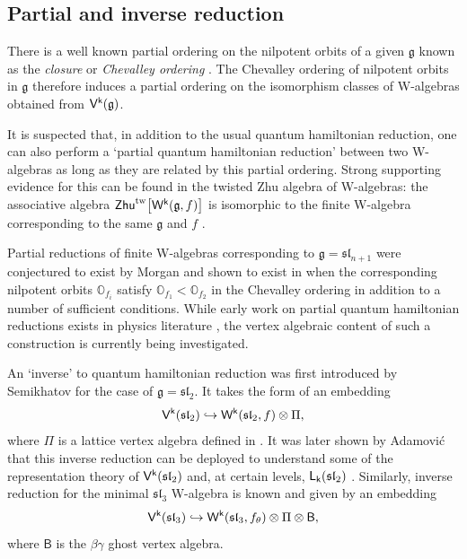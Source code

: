\documentclass[10pt,a4paper]{amsart}
\numberwithin{equation}{section}
\newcommand{\kk}{\mathsf{k}}   %
\DeclarePairedDelimiter{\brac}{\lparen}{\rparen}   %
\DeclarePairedDelimiter{\sqbrac}{\lbrack}{\rbrack} %
\newcommand{\alg}[1]{\mathfrak{#1}}  %
\newcommand{\VOA}[1]{\mathsf{#1}}    %
\newcommand{\SLA}[2]{\alg{#1}_{#2}}                      %
\newcommand{\sltwo}{\SLA{sl}{2}}
\newcommand{\slthree}{\SLA{sl}{3}}
\newcommand{\slnpone}{\SLA{sl}{n+1}}
\newcommand{\Wsymb}{\VOA{W}}
\newcommand{\uaffvoa}[2]{\VOA{V}^{#1}\brac{#2}}                   %
\newcommand{\saffvoa}[2]{\VOA{L}_{#1}\brac{#2}}                   %
\newcommand{\bgvoa}{\VOA{B}}                                      %
\newcommand{\halflattice}{\Pi}                          		  %
\newcommand{\uQHR}[3]{\Wsymb^{#1}\brac{#2,#3}}                    %
\newcommand{\twist}{\textup{tw}}                         		  %
\newcommand{\twzhu}[1]{\mathsf{Zhu}^{\twist}\sqbrac[\big]{#1}} 	  %
\theoremstyle{plain}
\begin{document}
\subsection{Partial and inverse reduction} \label{subsec:Ordering}
There is a well known partial ordering on the nilpotent orbits of a given $\mathfrak{g}$ known as the \emph{closure} or \emph{Chevalley ordering} \cite{Collingwood17}. The Chevalley ordering of nilpotent orbits in $\mathfrak{g}$ therefore induces a partial ordering on the isomorphism classes of W-algebras obtained from $\uaffvoa{\kk}{\mathfrak{g}}$. 

It is suspected that, in addition to the usual quantum hamiltonian reduction, one can also perform a `partial quantum hamiltonian reduction' between two W-algebras as long as they are related by this partial ordering. Strong supporting evidence for this can be found in the twisted Zhu algebra of W-algebras: the associative algebra $\twzhu{\uQHR{\kk}{\mathfrak{g}}{f}}$ is isomorphic to the finite W-algebra corresponding to the same $\mathfrak{g}$ and $f$ \cite{DeSFin06}. 

Partial reductions of finite W-algebras corresponding to $\mathfrak{g} = \slnpone$ were conjectured to exist by Morgan \cite{MorQua15} and shown to exist  in \cite{GenStage22} when the corresponding nilpotent orbits $\mathbb{O}_{f_i}$ satisfy $\mathbb{O}_{f_1} < \mathbb{O}_{f_2}$ in the Chevalley ordering in addition to a number of sufficient conditions. While early work on partial quantum hamiltonian reductions exists in physics literature \cite{RagSecond97}, the vertex algebraic content of such a construction is currently being investigated.

An `inverse' to quantum hamiltonian reduction was first introduced by Semikhatov \cite{SemInv94} for the case of $\mathfrak{g}=\sltwo$. It takes the form of an embedding 
%
\begin{equation} \label{eq:printosubsl2}
    \uaffvoa{\kk}{\sltwo} \hookrightarrow \uQHR{\kk}{\sltwo}{f} \otimes \halflattice,
\end{equation}
%
where $\halflattice$ is a lattice vertex algebra defined in \cite{BerRep02}. It was later shown by Adamovi\'c that this inverse reduction can be deployed to understand some of the representation theory of $\uaffvoa{\kk}{\sltwo}$ and, at certain levels, $\saffvoa{\kk}{\sltwo}$ \cite{AdaRea17}. Similarly, inverse reduction for the minimal $\slthree$ W-algebra is known \cite{ACG21} and given by an embedding
%
\begin{equation}
    \uaffvoa{\kk}{\slthree} \hookrightarrow \uQHR{\kk}{\slthree}{f_\theta} \otimes \halflattice \otimes \bgvoa,
\end{equation}
%
where $\bgvoa$ is the $\beta \gamma$ ghost vertex algebra. 
\end{document}
